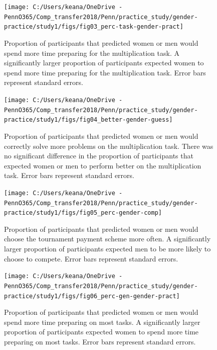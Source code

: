 \documentclass[a4paper, nobind]{templates/ociamthesis}
\begin{document}
\begin{figure}

{\centering \texttt{[image: C:/Users/keana/OneDrive - PennO365/Comp\_transfer2018/Penn/practice\_study/gender-practice/study1/figs/fig03\_perc-task-gender-pract]} 

}

\caption{Proportion of participants that predicted women or men would spend more time preparing for the multiplication task. A significantly larger proportion of participants expected women to spend more time preparing for the multiplication task. Error bars represent standard errors.}\label{fig:s103}
\end{figure}

\begin{figure}

{\centering \texttt{[image: C:/Users/keana/OneDrive - PennO365/Comp\_transfer2018/Penn/practice\_study/gender-practice/study1/figs/fig04\_better-gender-guess]} 

}

\caption{Proportion of participants that predicted women or men would correctly solve more problems on the multiplication task. There was no significant difference in the proportion of participants that expected women or men to perform better on the multiplication task. Error bars represent standard errors.}\label{fig:s104}
\end{figure}

\begin{figure}

{\centering \texttt{[image: C:/Users/keana/OneDrive - PennO365/Comp\_transfer2018/Penn/practice\_study/gender-practice/study1/figs/fig05\_perc-gender-comp]} 

}

\caption{Proportion of participants that predicted women or men would choose the tournament payment scheme more often. A significantly larger proportion of participants expected men to be more likely to choose to compete. Error bars represent standard errors.}\label{fig:s105}
\end{figure}

\begin{figure}

{\centering \texttt{[image: C:/Users/keana/OneDrive - PennO365/Comp\_transfer2018/Penn/practice\_study/gender-practice/study1/figs/fig06\_perc-gen-gender-pract]} 

}

\caption{Proportion of participants that predicted women or men would spend more time preparing on most tasks. A significantly larger proportion of participants expected women to spend more time preparing on most tasks. Error bars represent standard errors.}\label{fig:s106}
\end{figure}
\end{document}
